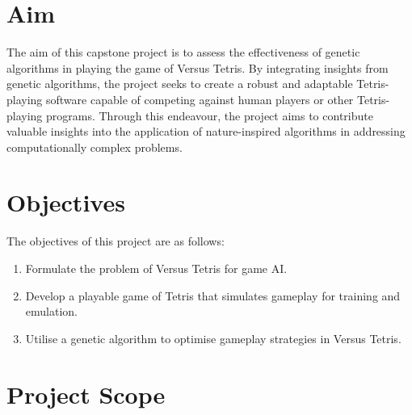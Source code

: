 \documentclass[a4paper, 12pt]{extreport}
\begin{document}
	\section{Aim}
	
	
	The aim of this capstone project is to assess the effectiveness of genetic algorithms in playing the game of Versus Tetris. By integrating insights from genetic algorithms, the project seeks to create a robust and adaptable Tetris-playing software capable of competing against human players or other Tetris-playing programs. Through this endeavour, the project aims to contribute valuable insights into the application of nature-inspired algorithms in addressing computationally complex problems.
	
	\section{Objectives}
	
	
	The objectives of this project are as follows:
	
	\begin{enumerate}
		\item Formulate the problem of Versus Tetris for game AI.
		\item Develop a playable game of Tetris that simulates gameplay for training and emulation.
		\item Utilise a genetic algorithm to optimise gameplay strategies in Versus Tetris.
	\end{enumerate}
	
	\section{Project Scope}
	
\end{document}
